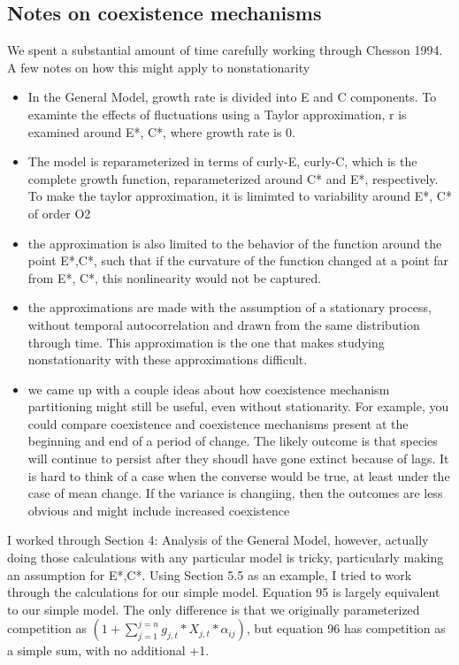 \documentclass[11pt,a4paper,oneside]{article}
\begin{document}
\subsection{Notes on coexistence mechanisms}
We spent a substantial amount of time carefully working through Chesson 1994.  A few notes on how this might apply to nonstationarity
\begin{itemize}
\item In the General Model, growth rate is divided into E and C components.  To examinte the effects of fluctuations using a Taylor approximation, r is examined around E*, C*, where growth rate is 0.  
\item  The model is reparameterized in terms of curly-E, curly-C, which is the complete growth function, reparameterized around C* and E*, respectively.  To make the taylor approximation, it is limimted to variability around E*, C* of order O2
\item the approximation is also limited to the behavior of the function around the point E*,C*, such that if the curvature of the function changed at a point far from E*, C*, this nonlinearity would not be captured.
\item  the approximations are made with the assumption of a stationary process, without temporal autocorrelation and drawn from the same distribution through time.  This approximation is the one that makes studying nonstationarity with these approximations difficult. 
\item  we came up with a couple ideas about how coexistence mechanism partitioning might still be useful, even without stationarity.  For example, you could compare coexistence and coexistence mechanisms present at the beginning and end of a period of change.  The likely outcome is that species will continue to persist after they shoudl have gone extinct because of lags.  It is hard to think of a case when the converse would be true, at least under the case of mean change.  If the variance is changiing, then the outcomes are less obvious and might include increased coexistence
\end{itemize}
I worked through Section 4: Analysis of the General Model, however, actually doing those calculations with any particular model is tricky, particularly making an assumption for E*,C*.  Using Section 5.5 as an example, I tried to work through the calculations for our simple model.  Equation 95 is largely equivalent to our simple model. The only difference is that we originally parameterized competition as $(1+ \sum\limits_{j=1}^{j=n}g_{j,t}*X_{j,t}*\alpha_{ij})$, but equation 96 has competition as a simple sum, with no additional +1. %
\end{document}
